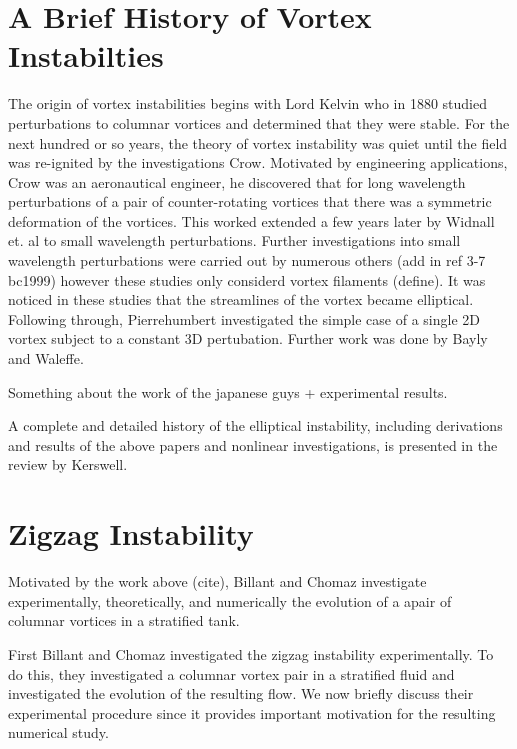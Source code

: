 \section{A Brief History of Vortex Instabilties}

The origin of vortex instabilities begins with Lord Kelvin who in 1880 studied perturbations to columnar vortices and determined that they were stable. For the next hundred or so years, the theory of vortex instability was quiet until the field was re-ignited by the investigations Crow\cite{crow1970}. Motivated by engineering applications, Crow was an aeronautical engineer, he discovered that for long wavelength perturbations of a pair of counter-rotating vortices that there was a symmetric deformation of the vortices. This worked extended a few years later by Widnall et. al \cite{widnall1974} to small wavelength perturbations. Further investigations into small wavelength perturbations were carried out by numerous others\cite{moore1975,tsai1976} (add in ref 3-7 bc1999) however these studies only considerd vortex filaments (define). It was noticed in these studies that the streamlines of the vortex became elliptical. Following through, Pierrehumbert\cite{pierrehumbert1986} investigated the simple case of a single 2D vortex subject to a constant 3D pertubation. Further work was done by Bayly \cite{bayly1986} and Waleffe\cite{waleffe1990}.

Something about the work of the japanese guys + experimental results. 

A complete and detailed history of the elliptical instability, including derivations and results of the above papers and nonlinear investigations, is presented in the review by Kerswell\cite{kerswell2002}.
\section{Zigzag Instability}
Motivated by the work above (cite), Billant and Chomaz investigate experimentally\cite{bc2000a}, theoretically\cite{bc2000b}, and numerically \cite{bc2000c} the evolution of a apair of columnar vortices in a stratified tank.

First Billant and Chomaz investigated the zigzag instability experimentally. To do this, they investigated a columnar vortex pair in a stratified fluid and investigated the evolution of the resulting flow. We now briefly discuss their experimental procedure since it provides important motivation for the resulting numerical study. 

